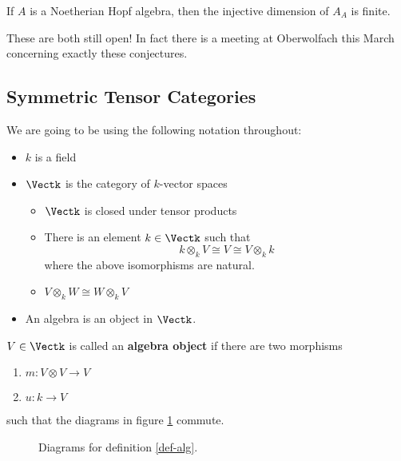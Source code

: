 \documentclass[12pt]{article}
\begin{document}
\begin{conj}
	If $A$ is a Noetherian Hopf algebra, then the injective dimension of $A_A$ is finite.
\end{conj}

These are both still open! In fact there is a meeting at Oberwolfach this March concerning
exactly these conjectures.

\subsection{Symmetric Tensor Categories}
We are going to be using the following notation throughout:
\begin{itemize}
	\item $k$ is a field
	\item $\Vectk$ is the category of $k$-vector spaces
	\begin{itemize}
		\item $\Vectk$ is closed under tensor products
		\item There is an element $k\in\Vectk$ such that
		\[k\otimes_k V\cong V\cong V\otimes_k k\]
		where the above isomorphisms are natural.
		\item $V\otimes_k W\cong W\otimes_k V$
	\end{itemize}
	\item An algebra is an object in $\Vectk$.
\end{itemize}

\begin{defn}\label{def-alg}
	$V\in\Vectk$ is called an \textbf{algebra object} if there are two morphisms
	\begin{enumerate}
		\item $m:V\otimes V\to V$
		\item $u:k\to V$
	\end{enumerate}
	such that the diagrams in figure \ref{fig-alg} commute.
	
\end{defn}
\begin{figure}\label{fig-alg}
	\caption{Diagrams for definition \ref{def-alg}.}
\end{figure}
\end{document}
